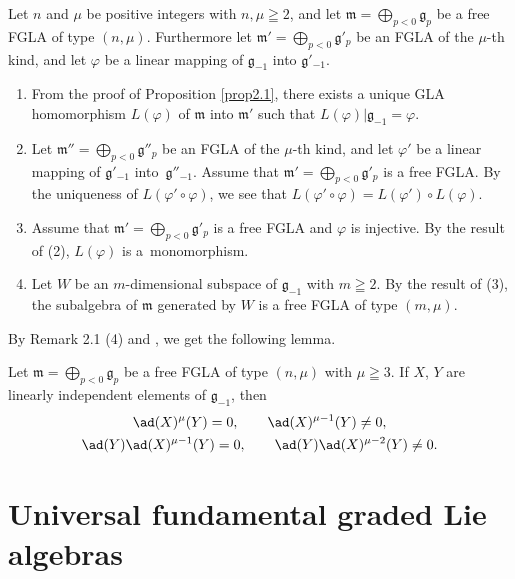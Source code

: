 \begin{remark}
Let $n$ and $\mu$ be positive integers with $n,\mu\geqq2$, and
let $\mathfrak m=\bigoplus\limits_{p<0}\mathfrak g_p$ be a free FGLA of
type $(n,\mu)$.  Furthermore
let $\mathfrak m'=\bigoplus\limits_{p<0}\mathfrak g'_p$
be an FGLA of the $\mu$-th kind,
and let $\varphi$ be a linear mapping of $\mathfrak g_{-1}$ into
$\mathfrak g'_{-1}$.
\begin{enumerate}\itemsep=0pt
\item
From the proof of Proposition \ref{prop2.1}, there exists a unique GLA
homomorphism $L(\varphi)$ of $\mathfrak m$ into $\mathfrak m'$
such that $L(\varphi)|\mathfrak g_{-1}=\varphi$.
\item
Let $\mathfrak m''=\bigoplus\limits_{p<0}\mathfrak g''_p$
be an FGLA of the $\mu$-th kind,
and let $\varphi'$ be a linear mapping of $\mathfrak g'_{-1}$ into~$\mathfrak g''_{-1}$. Assume that $\mathfrak m'=\bigoplus\limits_{p<0}\mathfrak g'_p$ is a free FGLA. By the uniqueness of $L(\varphi'\circ\varphi)$,
we see that
$L(\varphi'\circ\varphi)=L(\varphi')\circ L(\varphi)$.
\item Assume that $\mathfrak m'=\bigoplus\limits_{p<0}\mathfrak g'_p$ is a
free FGLA and $\varphi$ is injective. By the result of (2),
$L(\varphi)$ is a~monomorphism.
\item Let $W$ be an $m$-dimensional subspace of $\mathfrak g_{-1}$ with $m\geqq2$.
By the result of (3), the subalgebra of $\mathfrak m$ generated by $W$ is a
free FGLA of type $(m,\mu)$.
\end{enumerate}
\end{remark}
By Remark 2.1 (4) and \cite[Chapter~II, \S~2, Theorem~1]{bou72:1}, we get the following lemma.
\begin{lemma}\label{lem2.1} Let $\mathfrak m=\bigoplus\limits_{p<0}\mathfrak g_p$ be a
free FGLA of type $(n,\mu)$ with $\mu\geqq3$.
If $X$, $Y$ are linearly independent elements of $\mathfrak g_{-1}$, then
\begin{gather*}
\ad(X)^\mu(Y)=0, \qquad \ad(X)^{\mu-1}(Y)\ne 0, \\
\ad(Y)\ad(X)^{\mu-1}(Y)=0, \qquad \ad(Y)\ad(X)^{\mu-2}(Y)\ne 0.
\end{gather*}
\end{lemma}

\section{Universal fundamental graded Lie algebras}\label{section3}

